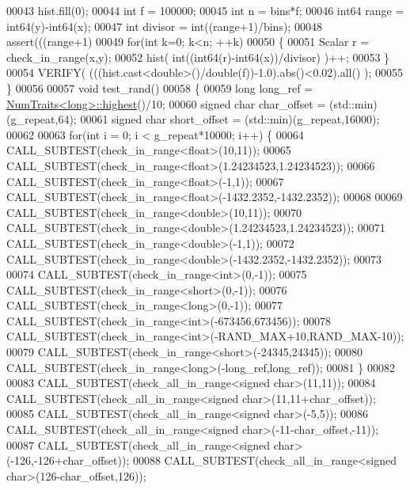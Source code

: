 \begin{DoxyCode}
00043   hist.fill(0);
00044   \textcolor{keywordtype}{int} f = 100000;
00045   \textcolor{keywordtype}{int} n = bins*f;
00046   int64 range = int64(y)-int64(x);
00047   \textcolor{keywordtype}{int} divisor = int((range+1)/bins);
00048   assert(((range+1)%
00049   \textcolor{keywordflow}{for}(\textcolor{keywordtype}{int} k=0; k<n; ++k)
00050   \{
00051     Scalar r = check\_in\_range(x,y);
00052     hist( \textcolor{keywordtype}{int}((int64(r)-int64(x))/divisor) )++;
00053   \}
00054   VERIFY( (((hist.cast<\textcolor{keywordtype}{double}>()/\textcolor{keywordtype}{double}(f))-1.0).abs()<0.02).all() );
00055 \}
00056 
00057 \textcolor{keywordtype}{void} test\_rand()
00058 \{
00059   \textcolor{keywordtype}{long} long\_ref = \hyperlink{group___core___module_struct_eigen_1_1_num_traits}{NumTraits<long>::highest}()/10;
00060   \textcolor{keywordtype}{signed} \textcolor{keywordtype}{char} char\_offset = (std::min)(g\_repeat,64);
00061   \textcolor{keywordtype}{signed} \textcolor{keywordtype}{char} short\_offset = (std::min)(g\_repeat,16000);
00062 
00063   \textcolor{keywordflow}{for}(\textcolor{keywordtype}{int} i = 0; i < g\_repeat*10000; i++) \{
00064     CALL\_SUBTEST(check\_in\_range<float>(10,11));
00065     CALL\_SUBTEST(check\_in\_range<float>(1.24234523,1.24234523));
00066     CALL\_SUBTEST(check\_in\_range<float>(-1,1));
00067     CALL\_SUBTEST(check\_in\_range<float>(-1432.2352,-1432.2352));
00068 
00069     CALL\_SUBTEST(check\_in\_range<double>(10,11));
00070     CALL\_SUBTEST(check\_in\_range<double>(1.24234523,1.24234523));
00071     CALL\_SUBTEST(check\_in\_range<double>(-1,1));
00072     CALL\_SUBTEST(check\_in\_range<double>(-1432.2352,-1432.2352));
00073 
00074     CALL\_SUBTEST(check\_in\_range<int>(0,-1));
00075     CALL\_SUBTEST(check\_in\_range<short>(0,-1));
00076     CALL\_SUBTEST(check\_in\_range<long>(0,-1));
00077     CALL\_SUBTEST(check\_in\_range<int>(-673456,673456));
00078     CALL\_SUBTEST(check\_in\_range<int>(-RAND\_MAX+10,RAND\_MAX-10));
00079     CALL\_SUBTEST(check\_in\_range<short>(-24345,24345));
00080     CALL\_SUBTEST(check\_in\_range<long>(-long\_ref,long\_ref));
00081   \}
00082 
00083   CALL\_SUBTEST(check\_all\_in\_range<signed char>(11,11));
00084   CALL\_SUBTEST(check\_all\_in\_range<signed char>(11,11+char\_offset));
00085   CALL\_SUBTEST(check\_all\_in\_range<signed char>(-5,5));
00086   CALL\_SUBTEST(check\_all\_in\_range<signed char>(-11-char\_offset,-11));
00087   CALL\_SUBTEST(check\_all\_in\_range<signed char>(-126,-126+char\_offset));
00088   CALL\_SUBTEST(check\_all\_in\_range<signed char>(126-char\_offset,126));

\end{DoxyCode}
